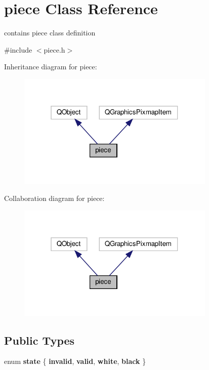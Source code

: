 \hypertarget{classpiece}{}\section{piece Class Reference}
\label{classpiece}


contains piece class definition  




{\ttfamily \#include $<$piece.\+h$>$}



Inheritance diagram for piece\+:\nopagebreak
\begin{figure}[H]
\begin{center}
\leavevmode
\includegraphics[width=268pt]{classpiece__inherit__graph}
\end{center}
\end{figure}


Collaboration diagram for piece\+:\nopagebreak
\begin{figure}[H]
\begin{center}
\leavevmode
\includegraphics[width=268pt]{classpiece__coll__graph}
\end{center}
\end{figure}
\subsection*{Public Types}
\begin{DoxyCompactItemize}
\item 
\mbox{\label{classpiece_a73c0d56d279ed4910cfc0e95ca40be6e}} 
enum {\bfseries state} \{ {\bfseries invalid}, 
{\bfseries valid}, 
{\bfseries white}, 
{\bfseries black}
 \}
\end{DoxyCompactItemize}

